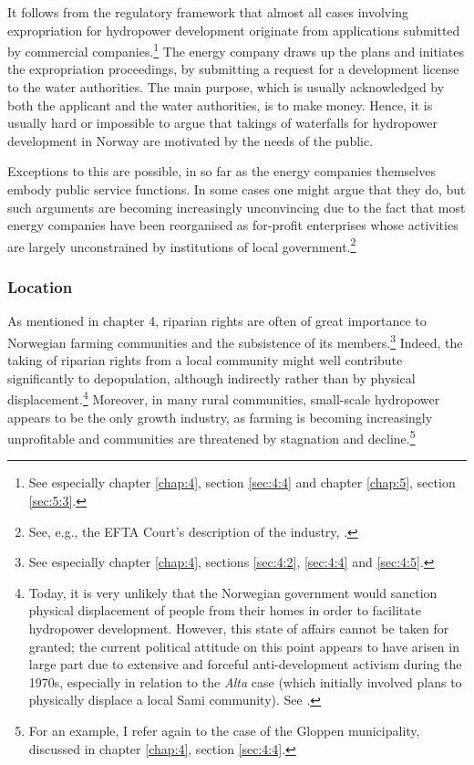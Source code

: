 It follows from the regulatory framework that almost all cases involving expropriation for hydropower development originate from applications submitted by commercial companies.\footnote{See especially chapter \ref{chap:4}, section \ref{sec:4:4} and chapter \ref{chap:5}, section \ref{sec:5:3}.} The energy company draws up the plans and initiates the expropriation proceedings, by submitting a request for a development license to the water authorities. The main purpose, which is usually acknowledged by both the applicant and the water authorities, is to make money. Hence, it is usually hard or impossible to argue that takings of waterfalls for hydropower development in Norway are motivated by the needs of the public. %

Exceptions to this are possible, in so far as the energy companies themselves embody public service functions. In some cases one might argue that they do, but such arguments are becoming increasingly unconvincing due to the fact that most energy companies have been reorganised as for-profit enterprises whose activities are largely unconstrained by institutions of local government.\footnote{See, e.g., the EFTA Court's description of the industry, \cite{efta07}.}

\subsubsection{Location}\label{sec:5:7:4}

 As mentioned in chapter 4, riparian rights are often of great importance to Norwegian farming communities and the subsistence of its members.\footnote{See especially chapter \ref{chap:4}, sections \ref{sec:4:2}, \ref{sec:4:4} and \ref{sec:4:5}.} Indeed, the taking of riparian rights from a local community might well contribute significantly to depopulation, although indirectly rather than by physical displacement.\footnote{Today, it is very unlikely that the Norwegian government would sanction physical displacement of people from their homes in order to facilitate hydropower development. However, this state of affairs cannot be taken for granted; the current political attitude on this point appears to have arisen in large part due to extensive and forceful anti-development activism during the 1970s, especially in relation to the {\it Alta} case (which initially involved plans to physically displace a local Sami community). See \cite{altawiki}.} Moreover, in many rural communities, small-scale hydropower appears to be the only growth industry, as farming is becoming increasingly unprofitable and communities are threatened by stagnation and decline.\footnote{For an example, I refer again to the case of the Gloppen municipality, discussed in chapter \ref{chap:4}, section \ref{sec:4:4}.}

